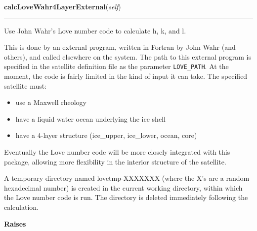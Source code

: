     \label{satstress:SatStress:StressDef:calcLoveWahr4LayerExternal}

    \vspace{0.5ex}

\hspace{.8\funcindent}\begin{boxedminipage}{\funcwidth}

    \raggedright \textbf{calcLoveWahr4LayerExternal}(\textit{self})

    \vspace{-1.5ex}

    \rule{\textwidth}{0.5\fboxrule}
\setlength{\parskip}{2ex}
    Use John Wahr's Love number code to calculate h, k, and l.

    This is done by an external program, written in Fortran by John Wahr 
    (and others), and called elsewhere on the system.  The path to this 
    external program is specified in the satellite definition file as the 
    parameter \texttt{LOVE\_PATH}.  At the moment, the code is fairly 
    limited in the kind of input it can take.  The specified satellite 
    must:

    \begin{itemize}
    \setlength{\parskip}{0.6ex}
      \item use a Maxwell rheology

      \item have a liquid water ocean underlying the ice shell

      \item have a 4-layer structure (ice\_upper, ice\_lower, ocean, core)

    \end{itemize}

    Eventually the Love number code will be more closely integrated with 
    this package, allowing more flexibility in the interior structure of 
    the satellite.

    A temporary directory named lovetmp-XXXXXXX (where the X's are a random
    hexadecimal number) is created in the current working directory, within
    which the Love number code is run.  The directory is deleted 
    immediately following the calculation.

\setlength{\parskip}{1ex}
      \textbf{Raises}
    \vspace{-1ex}


\end{boxedminipage}
